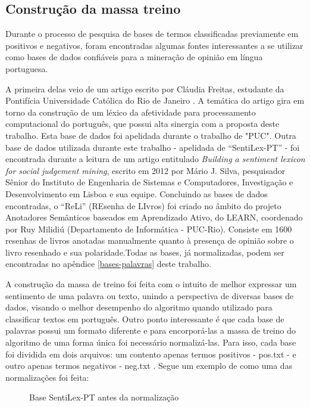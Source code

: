 \subsection{Construção da massa treino}
Durante o processo de pesquisa de bases de termos classificadas previamente em positivos e negativos, foram encontradas algumas fontes interessantes a se utilizar como bases de dados confiáveis para a mineração de opinião em língua portuguesa.

A primeira delas veio de um artigo escrito por Cláudia Freitas, estudante da Pontifícia Universidade Católica do Rio de Janeiro \cite{freitas2013construccao}. A temática do artigo gira em torno da construção de um léxico da afetividade para processamento computacional do português, que possui alta sinergia com a proposta deste trabalho. Esta base de dados foi apelidada durante o trabalho de "PUC".
Outra base de dados utilizada durante este trabalho - apelidada de \enquote{SentiLex-PT} - foi encontrada durante a leitura de um artigo entitulado \textit{Building a sentiment lexicon for social judgement mining}\cite{marioj.silvapaulacarvalholuissarmento2012}, escrito em 2012 por Mário J. Silva, pesquisador Sênior do Instituto de Engenharia de Sistemas e Computadores, Investigação e Desenvolvimento em Lisboa e sua equipe. 
Concluindo as bases de dados encontradas, o \enquote{ReLi} (REsenha de LIvros) foi criado no âmbito do projeto Anotadores Semânticos baseados em Aprendizado Ativo, do LEARN, coordenado por Ruy Milidiú (Departamento de Informática - PUC-Rio). Consiste em 1600 resenhas de livros anotadas manualmente quanto à presença de opinião sobre o livro resenhado e sua polaridade\cite{reli-resenha-livros}.Todas as bases, já normalizadas, podem ser encontradas no apêndice \ref{bases-palavras} deste trabalho. 

A construção da massa de treino foi feita com o intuito de melhor expressar um sentimento de uma palavra ou texto, unindo a perspectiva de diversas bases de dados, visando o melhor desempenho do algoritmo quando utilizado para classificar textos em português. Outro ponto interessante é que cada base de palavras possui um formato diferente e para encorporá-las a massa de treino do algoritmo de uma forma única foi necessário normalizá-las. Para isso, cada base foi dividida em dois arquivos: um contento apenas termos positivos - pos.txt - e outro apenas termos negativos - neg.txt . Segue um exemplo de como uma das normalizações foi feita:


\begin{figure}[H]
	\centering{}
	\caption{Base SentiLex-PT antes da normalização}
	\label{sentilex}
\end{figure}

